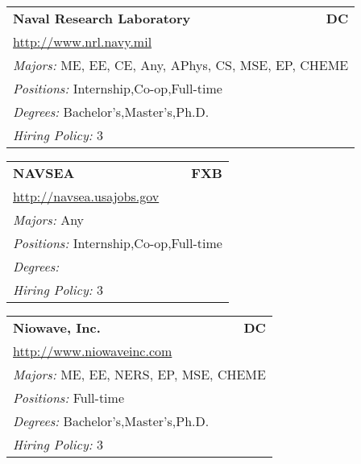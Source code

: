 \documentclass[twoside]{article}
\begin{document}
\begin{center}
\begin{multicols}{3}
\begin{FlushLeft}
\begin{minipage}{.9\columnwidth}
\end{minipage}
 
\begin{minipage}{.9\columnwidth}\begin{tabularx}{.95\columnwidth}{Xr}
                 {\Large\bf Naval Research Laboratory} & {\Large\bf DC}\\
    \multicolumn{2}{p{.95\columnwidth}}{\url{http://www.nrl.navy.mil}}\\
    \multicolumn{2}{p{.95\columnwidth}}{\emph{Majors:} ME, EE, CE, Any, APhys, CS, MSE, EP, CHEME}\\
    \multicolumn{2}{p{.95\columnwidth}}{\emph{Positions:} Internship,Co-op,Full-time}\\
    \multicolumn{2}{p{.95\columnwidth}}{\emph{Degrees:} Bachelor's,Master's,Ph.D.}\\
    \multicolumn{2}{p{.95\columnwidth}}{\emph{Hiring Policy:} 3}\\
    \end{tabularx}
    
\end{minipage}
 
\begin{minipage}{.9\columnwidth}\begin{tabularx}{.95\columnwidth}{Xr}
                 {\Large\bf NAVSEA} & {\Large\bf FXB}\\
    \multicolumn{2}{p{.95\columnwidth}}{\url{http://navsea.usajobs.gov}}\\
    \multicolumn{2}{p{.95\columnwidth}}{\emph{Majors:} Any}\\
    \multicolumn{2}{p{.95\columnwidth}}{\emph{Positions:} Internship,Co-op,Full-time}\\
    \multicolumn{2}{p{.95\columnwidth}}{\emph{Degrees:} }\\
    \multicolumn{2}{p{.95\columnwidth}}{\emph{Hiring Policy:} 3}\\
    \end{tabularx}
    
\end{minipage}
 
\begin{minipage}{.9\columnwidth}\begin{tabularx}{.95\columnwidth}{Xr}
                 {\Large\bf Niowave, Inc.} & {\Large\bf DC}\\
    \multicolumn{2}{p{.95\columnwidth}}{\url{http://www.niowaveinc.com}}\\
    \multicolumn{2}{p{.95\columnwidth}}{\emph{Majors:} ME, EE, NERS, EP, MSE, CHEME}\\
    \multicolumn{2}{p{.95\columnwidth}}{\emph{Positions:} Full-time}\\
    \multicolumn{2}{p{.95\columnwidth}}{\emph{Degrees:} Bachelor's,Master's,Ph.D.}\\
    \multicolumn{2}{p{.95\columnwidth}}{\emph{Hiring Policy:} 3}\\
    \end{tabularx}
    

\end{minipage}
\end{FlushLeft}
\end{multicols}
\end{center}
\end{document}
